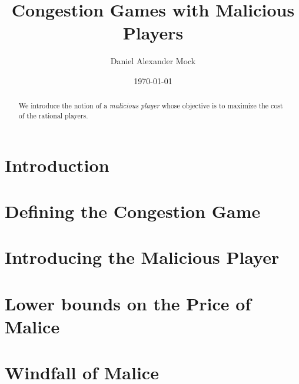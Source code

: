 \documentclass{scrartcl}
\title{Congestion Games with Malicious Players}
\author{Daniel Alexander Mock}
\date{\today}
\begin{document}
	\maketitle
	
	\begin{abstract}
		We introduce the notion of a \emph{malicious player} whose objective is to maximize the cost of the rational players.
	\end{abstract}

\section{Introduction}

\section{Defining the Congestion Game}

\section{Introducing the Malicious Player}

\section{Lower bounds on the Price of Malice}

\section{Windfall of Malice}
\end{document}
